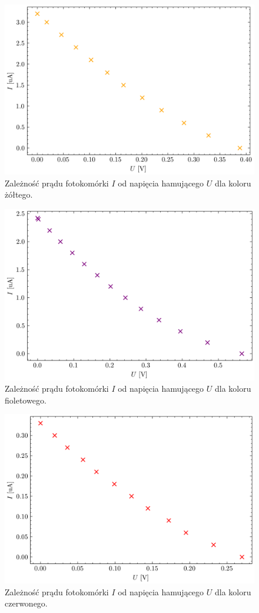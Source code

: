 \documentclass{fizykalab}
\begin{document}
\begin{figure}[H]
    \centering
    \includegraphics[width=0.75\linewidth]{yellow.png}
    \caption{
    Zależność prądu fotokomórki $I$ od napięcia hamującego $U$
    dla koloru żółtego.}
\end{figure}

\begin{figure}[H]
    \centering
    \includegraphics[width=0.75\linewidth]{purple.png}
    \caption{
    Zależność prądu fotokomórki $I$ od napięcia hamującego $U$
    dla koloru fioletowego.}
\end{figure}

\begin{figure}[H]
    \centering
    \includegraphics[width=0.75\linewidth]{red.png}
    \caption{
    Zależność prądu fotokomórki $I$ od napięcia hamującego $U$
    dla koloru czerwonego.}
\end{figure}
\end{document}
